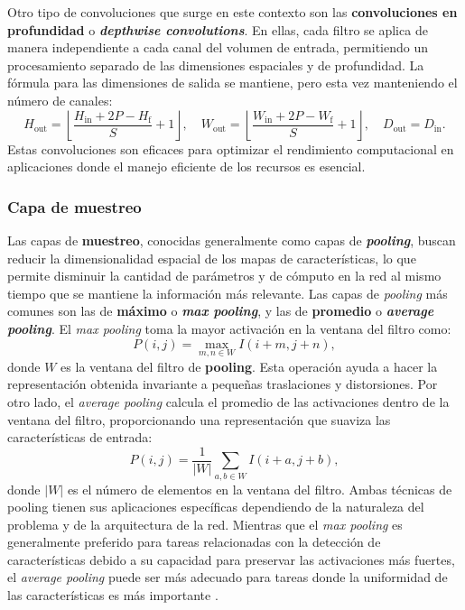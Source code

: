 Otro tipo de convoluciones que surge en este contexto son las \textbf{convoluciones en profundidad} o \textbf{\textit{depthwise convolutions}}. En ellas, cada filtro se aplica de manera independiente a cada canal del volumen de entrada, permitiendo un procesamiento separado de las dimensiones espaciales y de profundidad. La fórmula para las dimensiones de salida se mantiene, pero esta vez manteniendo el número de canales:
\[
H_{\text{out}} = \left\lfloor \frac{H_{\text{in}} + 2P - H_{\text{f}}}{S} + 1 \right\rfloor, \quad W_{\text{out}} = \left\lfloor \frac{W_{\text{in}} + 2P - W_{\text{f}}}{S} + 1 \right\rfloor, \quad D_{\text{out}} = D_{\text{in}}.
\]
Estas convoluciones son eficaces para optimizar el rendimiento computacional en aplicaciones donde el manejo eficiente de los recursos es esencial.

\subsubsection{Capa de muestreo}

Las capas de \textbf{muestreo}, conocidas generalmente como capas de \textbf{\textit{pooling}}, buscan reducir la dimensionalidad espacial de los mapas de características, lo que permite disminuir la cantidad de parámetros y de cómputo en la red al mismo tiempo que se mantiene la información más relevante. Las capas de \textit{pooling} más comunes son las de \textbf{máximo} o \textbf{\textit{max pooling}}, y las de \textbf{promedio} o \textbf{\textit{average pooling}}. El \textit{max pooling} toma la mayor activación en la ventana del filtro como:
\begin{equation}
	P(i, j) = \max_{m, n \in W} I(i+m, j+n),
\end{equation}
donde \(W\) es la ventana del filtro de \textbf{pooling}. Esta operación ayuda a hacer la representación obtenida invariante a pequeñas traslaciones y distorsiones. Por otro lado, el \textit{average pooling} calcula el promedio de las activaciones dentro de la ventana del filtro, proporcionando una representación que suaviza las características de entrada:
\begin{equation}
	P(i, j) = \frac{1}{|W|} \sum_{a, b \in W} I(i+a, j+b),
\end{equation}
donde \(|W|\) es el número de elementos en la ventana del filtro. Ambas técnicas de pooling tienen sus aplicaciones específicas dependiendo de la naturaleza del problema y de la arquitectura de la red. Mientras que el \textit{max pooling} es generalmente preferido para tareas relacionadas con la detección de características debido a su capacidad para preservar las activaciones más fuertes, el \textit{average pooling} puede ser más adecuado para tareas donde la uniformidad de las características es más importante \cite{krizhevsky2012imagenet}.

